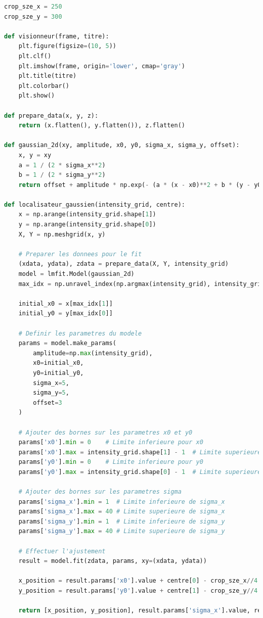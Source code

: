\documentclass[11pt,letterpaper]{article}
\begin{document}
\begin{lstlisting}[language=python]
crop_sze_x = 250
crop_sze_y = 300

def visionneur(frame, titre):
    plt.figure(figsize=(10, 5))
    plt.clf() 
    plt.imshow(frame, origin='lower', cmap='gray')
    plt.title(titre)
    plt.colorbar()  
    plt.show()

def prepare_data(x, y, z):
    return (x.flatten(), y.flatten()), z.flatten()

def gaussian_2d(xy, amplitude, x0, y0, sigma_x, sigma_y, offset):
    x, y = xy
    a = 1 / (2 * sigma_x**2)
    b = 1 / (2 * sigma_y**2)
    return offset + amplitude * np.exp(- (a * (x - x0)**2 + b * (y - y0)**2))

def localisateur_gaussien(intensity_grid, centre):
    x = np.arange(intensity_grid.shape[1])
    y = np.arange(intensity_grid.shape[0])
    X, Y = np.meshgrid(x, y)

    # Preparer les donnees pour le fit
    (xdata, ydata), zdata = prepare_data(X, Y, intensity_grid)
    model = lmfit.Model(gaussian_2d)
    max_idx = np.unravel_index(np.argmax(intensity_grid), intensity_grid.shape)

    initial_x0 = x[max_idx[1]]
    initial_y0 = y[max_idx[0]]

    # Definir les parametres du modele
    params = model.make_params(
        amplitude=np.max(intensity_grid),
        x0=initial_x0,
        y0=initial_y0,
        sigma_x=5,
        sigma_y=5,
        offset=3
    )

    # Ajouter des bornes sur les parametres x0 et y0
    params['x0'].min = 0    # Limite inferieure pour x0
    params['x0'].max = intensity_grid.shape[1] - 1  # Limite superieure pour x0
    params['y0'].min = 0    # Limite inferieure pour y0
    params['y0'].max = intensity_grid.shape[0] - 1  # Limite superieure pour y0

    # Ajouter des bornes sur les parametres sigma
    params['sigma_x'].min = 1  # Limite inferieure de sigma_x
    params['sigma_x'].max = 40 # Limite superieure de sigma_x
    params['sigma_y'].min = 1  # Limite inferieure de sigma_y
    params['sigma_y'].max = 40 # Limite superieure de sigma_y

    # Effectuer l'ajustement
    result = model.fit(zdata, params, xy=(xdata, ydata))
    
    x_position = result.params['x0'].value + centre[0] - crop_sze_x//4
    y_position = result.params['y0'].value + centre[1] - crop_sze_y//4

    return [x_position, y_position], result.params['sigma_x'].value, result.params['sigma_y'].value


\end{lstlisting}
\end{document}
